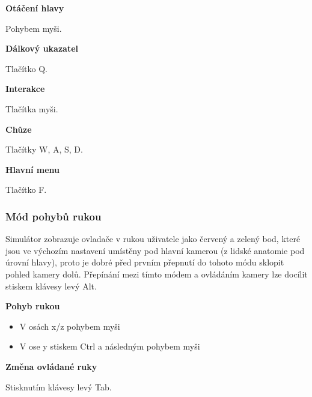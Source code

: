\documentclass[thesis=B,czech]{FITthesis}[2012/06/26]
\begin{document}
\begin{description}

	\item \textbf{Otáčení hlavy}
	
	Pohybem myši. 
	
	\item \textbf{Dálkový ukazatel}
	
	Tlačítko Q.		
	
	\item \textbf{Interakce}
	
	Tlačítka myši.
	
	
	\item \textbf{Chůze}
	
	Tlačítky W, A, S, D.
	
	
	
	\item \textbf{Hlavní menu}
	
	Tlačítko F.
	
\end{description}

\subsubsection{Mód pohybů rukou}
Simulátor zobrazuje ovladače v rukou uživatele jako červený a zelený bod, které jsou ve výchozím nastavení umístěny pod hlavní kamerou (z lidské anatomie pod úrovní hlavy), proto je dobré před prvním přepnutí do tohoto módu sklopit pohled kamery dolů. Přepínání mezi tímto módem a ovládáním kamery lze docílit stiskem klávesy levý Alt.

\begin{description}

	\item \textbf{Pohyb rukou}
	
	\begin{itemize}
		\item V osách x/z pohybem myši
		\item V ose y stiskem Ctrl a následným pohybem myši
	\end{itemize}

	\item \textbf{Změna ovládané ruky}
	
	Stisknutím klávesy levý Tab.	

\end{description}
\end{document}
